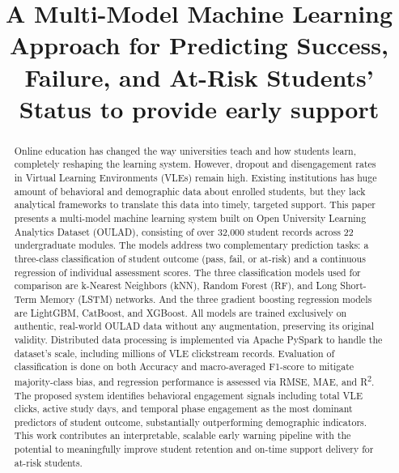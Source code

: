 \documentclass[conference]{IEEEtran}
\begin{document}
\title{A Multi-Model Machine Learning Approach for Predicting Success, Failure, and At-Risk Students' Status to provide early support}

\author{
\and
{}
}

\maketitle

\begin{abstract}
    Online education has changed the way universities teach and how students learn, completely reshaping the learning system. However, dropout and disengagement rates in Virtual Learning Environments (VLEs) remain high. Existing institutions has huge amount of behavioral and demographic data about enrolled students, but they lack analytical frameworks to translate this data into timely, targeted support. This paper presents a multi-model machine learning system built on Open University Learning Analytics Dataset (OULAD), consisting of over 32,000 student records across 22 undergraduate modules. The models address two complementary prediction tasks: a three-class classification of student outcome (pass, fail, or at-risk) and a continuous regression of individual assessment scores. The three classification models used for comparison are k-Nearest Neighbors (kNN), Random Forest (RF), and Long Short-Term Memory (LSTM) networks. And the three gradient boosting regression models are LightGBM, CatBoost, and XGBoost. All models are trained exclusively on authentic, real-world OULAD data without any augmentation, preserving its original validity. Distributed data processing is implemented via Apache PySpark to handle the dataset's scale, including millions of VLE clickstream records. Evaluation of classification is done on both Accuracy and macro-averaged F1-score to mitigate majority-class bias, and regression performance is assessed via RMSE, MAE, and R\textsuperscript{2}. The proposed system identifies behavioral engagement signals including total VLE clicks, active study days, and temporal phase engagement as the most dominant predictors of student outcome, substantially outperforming demographic indicators. This work contributes an interpretable, scalable early warning pipeline with the potential to meaningfully improve student retention and on-time support delivery for at-risk students.
\end{abstract}
\end{document}
